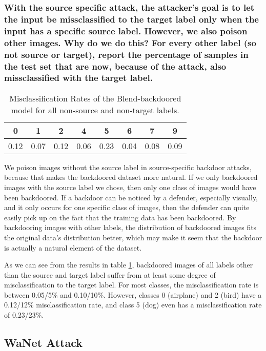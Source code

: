 \documentclass{article}
\begin{document}
\subsubsection{With the source specific attack, the attacker’s goal is to let the input
be missclassified to the target label only when the input has a specific source
label. However, we also poison other images. Why do we do this? For every
other label (so not source or target), report the percentage of samples in the test
set that are now, because of the attack, also missclassified with the target label.}
\begin{table}[h]
    \centering
    \begin{tabular}{c|c|c|c|c|c|c|c}
        \textbf{0} & \textbf{1} & \textbf{2} & \textbf{4} & \textbf{5} & \textbf{6} & \textbf{7} & \textbf{9} \\
        \hline
        0.12 & 0.07 & 0.12 & 0.06 & 0.23 & 0.04 & 0.08 & 0.09 \\
    \end{tabular}
    \caption{Misclassification Rates of the Blend-backdoored model for all non-source and non-target labels.}
    \label{tab:misclassification_rates}
\end{table}

We poison images without the source label in source-specific backdoor attacks, because that makes the backdoored dataset more natural. 
If we only backdoored images with the source label we chose, then only one class of images would have been backdoored. 
If a backdoor can be noticed by a defender, especially visually, and it only occurs for one specific class of images, then the defender can quite easily pick up on the fact that the training data has been backdoored. 
By backdooring images with other labels, the distribution of backdoored images fits the original data's distribution better, which may make it seem that the backdoor is actually a natural element of the dataset.

As we can see from the results in table \ref{tab:misclassification_rates}, backdoored images of all labels other than the source and target label suffer from at least some degree of misclassification to the target label. 
For most classes, the misclassification rate is between 0.05/5\% and 0.10/10\%. 
However, classes 0 (airplane) and 2 (bird) have a 0.12/12\% misclassification rate, and class 5 (dog) even has a misclassification rate of 0.23/23\%. 

\subsection{WaNet Attack}
\end{document}
